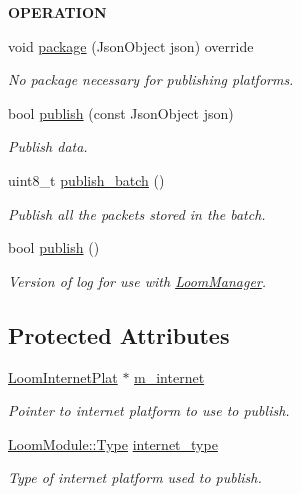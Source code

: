 \begin{Indent}{\bf O\+P\+E\+R\+A\+T\+I\+ON}\par
\begin{DoxyCompactItemize}
\item 
void \hyperlink{class_loom_publish_plat_ac8548fef404b55465773513aefce5608}{package} (Json\+Object json) override
\begin{DoxyCompactList}\small\item\em No package necessary for publishing platforms. \end{DoxyCompactList}\item 
bool \hyperlink{class_loom_publish_plat_a9be2ccbcaba4d1a5735bcd5bf828eafb}{publish} (const Json\+Object json)
\begin{DoxyCompactList}\small\item\em Publish data. \end{DoxyCompactList}\item 
uint8\+\_\+t \hyperlink{class_loom_publish_plat_ae0c0825a58465f124bfe07e3de8b3b25}{publish\+\_\+batch} ()
\begin{DoxyCompactList}\small\item\em Publish all the packets stored in the batch. \end{DoxyCompactList}\item 
bool \hyperlink{class_loom_publish_plat_a5a172ded7502cd31fe15596e21dd6cc9}{publish} ()
\begin{DoxyCompactList}\small\item\em Version of log for use with \hyperlink{class_loom_manager}{Loom\+Manager}. \end{DoxyCompactList}\end{DoxyCompactItemize}
\end{Indent}
\subsection*{Protected Attributes}
\begin{DoxyCompactItemize}
\item 
\hyperlink{class_loom_internet_plat}{Loom\+Internet\+Plat} $\ast$ \hyperlink{class_loom_publish_plat_a9e07931b084ea022c48485a2df28cc83}{m\+\_\+internet}
\begin{DoxyCompactList}\small\item\em Pointer to internet platform to use to publish. \end{DoxyCompactList}\item 
\hyperlink{class_loom_module_aee91d0a75140d51ee428fc2d4417d865}{Loom\+Module\+::\+Type} \hyperlink{class_loom_publish_plat_aab697868e61843787893f5509d22b9ed}{internet\+\_\+type}
\begin{DoxyCompactList}\small\item\em Type of internet platform used to publish. \end{DoxyCompactList}\end{DoxyCompactItemize}
